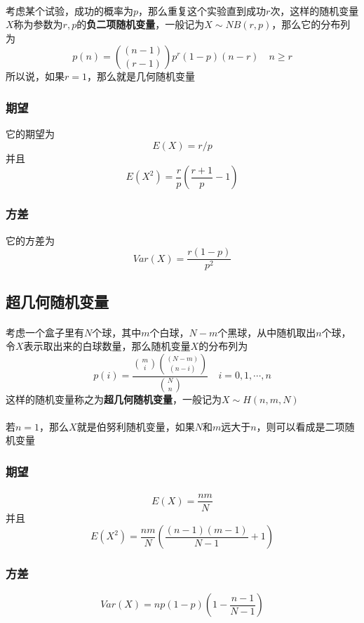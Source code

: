 \paragraph{}
考虑某个试验，成功的概率为$p$，那么重复这个实验直到成功$r$次，这样的随机变量$X$称为参数为$r, p$的\textbf{负二项随机变量}，一般记为$X \sim NB(r, p)$，那么它的分布列为
$$
p(n) = {(n-1)\choose (r-1)} p^r (1-p)(n-r)\quad n \geq r
$$
所以说，如果$r=1$，那么就是几何随机变量

\subsubsection{期望}
它的期望为
$$
E(X) = r/p
$$
并且
$$
E(X^2) =\frac{r}{p}(\frac{r+1}{p} - 1)
$$

\subsubsection{方差}
它的方差为
$$
Var(X) = \frac{r(1-p)}{p^2}
$$


\subsection{超几何随机变量}
\paragraph{}
考虑一个盒子里有$N$个球，其中$m$个白球，$N-m$个黑球，从中随机取出$n$个球，令$X$表示取出来的白球数量，那么随机变量$X$的分布列为
$$
p(i) = \frac{{m\choose i} {(N-m)\choose (n-i)}}{{N \choose n}} \quad i = 0, 1, \cdots, n
$$
这样的随机变量称之为\textbf{超几何随机变量}，一般记为$X \sim H(n, m, N)$
\paragraph{}
若$n=1$，那么$X$就是伯努利随机变量，如果$N$和$m$远大于$n$，则可以看成是二项随机变量

\subsubsection{期望}
\paragraph{}
$$
E(X) = \frac{nm}{N}
$$
并且
$$
E(X^2) = \frac{nm}{N} (\frac{(n-1)(m-1)}{N-1} + 1)
$$

\subsubsection{方差}
$$
Var(X) = np(1-p)(1 - \frac{n-1}{N-1})
$$


